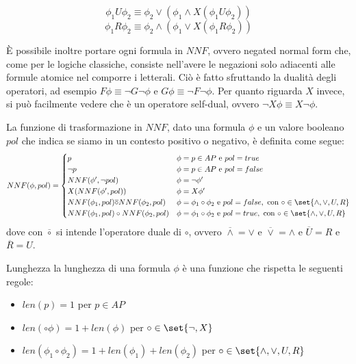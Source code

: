 \[\phi_1 U \phi_2 \equiv \phi_2 \lor (\phi_1 \land X(\phi_1 U \phi_2 ))\]
\[\phi_1 R \phi_2 \equiv \phi_2 \land (\phi_1 \lor X(\phi_1 R \phi_2 ))\]

È possibile inoltre portare ogni formula in \(NNF\), ovvero negated normal form che, come per le logiche classiche, consiste nell'avere le negazioni solo adiacenti alle formule atomice nel comporre i letterali. Ciò è fatto sfruttando la dualità degli operatori, ad esempio \(F\phi \equiv \neg G \neg \phi\) e \(G\phi \equiv \neg F \neg \phi\). Per quanto riguarda \(X\) invece, si può facilmente vedere che è un operatore self-dual, ovvero \(\neg X \phi \equiv X \neg \phi\).

La funzione di trasformazione in \(NNF\), dato una formula \(\phi\) e un valore booleano \(pol\) che indica se siamo in un contesto positivo o negativo, è definita come segue:
\[NNF(\phi, pol) = \begin{cases}
  p & \phi = p \in AP \text{ e } pol = true \\
  \neg p & \phi = p \in AP \text{ e } pol = false \\
  NNF(\phi', \neg pol) & \phi = \neg \phi'\\
  X (NNF(\phi', pol)) & \phi = X\phi' \\
  NNF(\phi_1, pol) \overline{\circ} NNF(\phi_2, pol) & \phi = \phi_1 \circ \phi_2 \text{ e } pol = false, \text{ con } \circ \in \set{\land, \lor, U, R}\\
  NNF(\phi_1, pol) \circ NNF(\phi_2, pol) & \phi = \phi_1 \circ \phi_2 \text{ e } pol = true, \text{ con } \circ \in \set{\land, \lor, U, R} 
\end{cases}\]
dove con \(\overline{\circ}\) si intende l'operatore duale di \(\circ\), ovvero \(\overline{\land} = \lor\) e \(\overline{\lor} = \land\) e \(\overline{U} = R\) e \(\overline{R} = U\).

\begin{definition}{Lunghezza}
  la lunghezza di una formula \(\phi\) è una funzione che rispetta le seguenti regole:
  \begin{itemize}
    \item \(len(p) = 1\) per \(p \in AP\)
    \item \(len(\circ \phi) = 1 + len(\phi)\) per \(\circ \in \set{\neg,X}\)
    \item \(len(\phi_1 \circ \phi_2) = 1 + len(\phi_1) + len(\phi_2)\) per \(\circ \in \set{\land, \lor, U, R}\)
  \end{itemize}
\end{definition}

